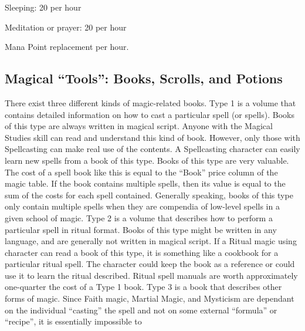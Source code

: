 \documentclass[twoside]{book}
\begin{document}
                  
                   Sleeping: 
                   20 per hour   
                  
                  
                   Meditation or prayer: 
                   20 per hour   
                  
                
              Mana Point replacement per hour.  
            
\subsection{Magical “Tools”: Books, Scrolls, and
               Potions}
      There exist three different kinds of magic-related
               books.   Type 1 is a volume that contains detailed
               information on how to cast a particular spell (or spells).
               Books of this type are always written in magical script.
               Anyone with the Magical Studies skill can read and
               understand this kind of book. However, only those with
               Spellcasting can make real use of the contents. A
               Spellcasting character can easily learn new spells from a
               book of this type. Books of this type are very valuable.
               The cost of a spell book like this is equal to the
               “Book” price column of the magic table. If the
               book contains multiple spells, then its value is equal to
               the sum of the costs for each spell contained. Generally
               speaking, books of this type only contain multiple spells
               when they are compendia of low-level spells in a given
               school of magic.   Type 2 is a volume that describes how to perform a
               particular spell in ritual format. Books of this type
               might be written in any language, and are generally not
               written in magical script. If a Ritual magic using
               character can read a book of this type, it is something
               like a cookbook for a particular ritual spell. The
               character could keep the book as a reference or could use
               it to learn the ritual described. Ritual spell manuals are
               worth approximately one-quarter the cost of a Type 1 book.
                 Type 3 is a book that describes other forms of
               magic. Since Faith magic, Martial Magic, and Mysticism are
               dependant on the individual “casting” the
               spell and not on some external “formula” or
               “recipe”, it is essentially impossible to
\end{document}
